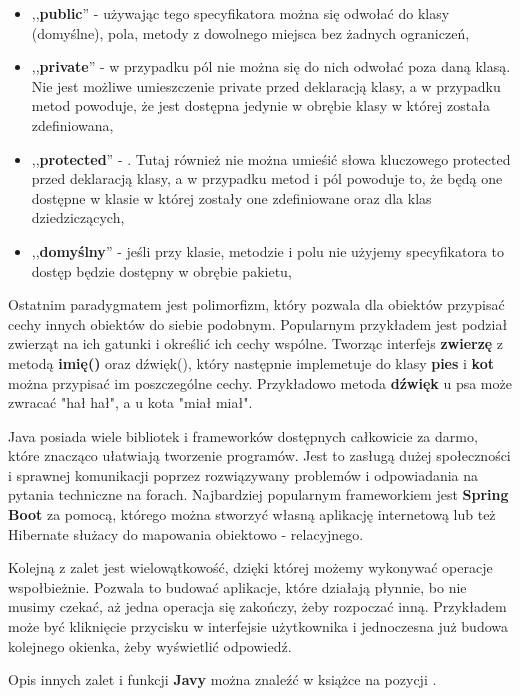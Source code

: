 \documentclass{iiuwb}
\begin{document}
\begin{itemize}
\item ,,\textbf{public}'' - używając tego specyfikatora można się odwołać do klasy (domyślne), pola, metody z dowolnego miejsca bez żadnych ograniczeń, 
\item ,,\textbf{private}'' - w przypadku pól nie można się do nich odwołać poza daną klasą. Nie jest możliwe umieszczenie private przed deklaracją klasy, a w przypadku metod powoduje, że jest dostępna jedynie w obrębie klasy w której została zdefiniowana, 
\item ,,\textbf{protected}'' -  . Tutaj również nie można umieśić słowa kluczowego protected przed deklaracją klasy, a w przypadku metod i pól powoduje to, że będą one dostępne w klasie w której zostały one zdefiniowane oraz dla klas dziedziczących, 
\item ,,\textbf{domyślny}'' - jeśli przy klasie, metodzie i polu nie użyjemy specyfikatora to dostęp będzie dostępny w obrębie pakietu, 
\end{itemize}

Ostatnim paradygmatem jest polimorfizm, który pozwala dla obiektów przypisać cechy innych obiektów do siebie podobnym. Popularnym przykładem jest podział zwierząt na ich gatunki i określić ich cechy wspólne. Tworząc interfejs \textbf{zwierzę} z metodą \textbf{imię()} oraz dźwięk(), który następnie implemetuje do klasy \textbf{pies} i \textbf{kot} można przypisać im poszczególne cechy. Przykładowo metoda \textbf{dźwięk} u psa może zwracać "hał hał", a u kota "miał miał". 

Java posiada wiele bibliotek i frameworków dostępnych całkowicie za darmo, które znacząco ułatwiają tworzenie programów. Jest to zasługą dużej społeczności i sprawnej komunikacji poprzez rozwiązywany problemów i odpowiadania na pytania techniczne na forach.  Najbardziej popularnym frameworkiem jest \textbf{Spring Boot} za pomocą, którego można stworzyć własną aplikację internetową lub też Hibernate służacy do mapowania  obiektowo - relacyjnego.

Kolejną z zalet jest wielowątkowość, dzięki której możemy wykonywać operacje wspołbieżnie. Pozwala to budować aplikacje, które działają płynnie, bo nie musimy czekać, aż jedna operacja się zakończy, żeby rozpoczać inną. Przykładem może być kliknięcie przycisku w interfejsie użytkownika i jednoczesna już budowa kolejnego okienka, żeby wyświetlić odpowiedź.

Opis innych zalet i funkcji \textbf{Javy} można znaleźć w książce 
na pozycji \cite{Java}.
\end{document}
